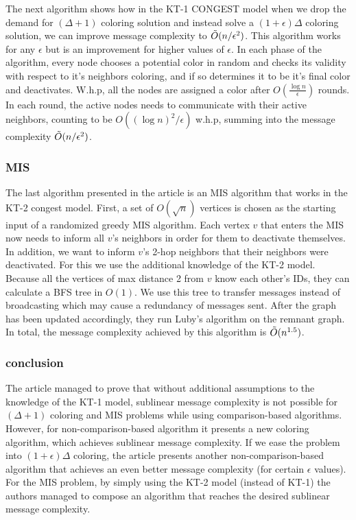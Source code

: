 \documentclass[11pt]{article}
\begin{document}
The next algorithm shows how in the KT-1 CONGEST model when we drop the demand for $(\Delta+1)$ coloring solution and instead solve a $(1+\epsilon)\Delta$ coloring solution, we can improve message complexity to $\Tilde{O}(n/\epsilon^2)$. This algorithm works for any $\epsilon$ but is an improvement for higher values of $\epsilon$.
In each phase of the algorithm, every node chooses a potential color in random and checks its validity with respect to it's neighbors coloring, and if so determines it to be it's final color and deactivates. W.h.p, all the nodes are assigned a color after $O(\frac{\log{n}}{\epsilon})$ rounds. In each round, the active nodes needs to communicate with their active neighbors, counting to be $O((\log{n})^{2}/ \epsilon)$ w.h.p, summing into the message complexity $\Tilde{O}(n/\epsilon^2)$.

\subsubsection*{MIS}

The last algorithm presented in the article is an MIS algorithm that works in the KT-2 congest model. First, a set of $O(\sqrt{n})$ vertices is chosen as the starting input of a randomized greedy MIS algorithm. Each vertex $v$ that enters the MIS now needs to inform all $v$'s neighbors in order for them to deactivate themselves. In addition, we want to inform $v$'s 2-hop neighbors that their neighbors were deactivated. For this we use the additional knowledge of the KT-2 model. Because all the vertices of max distance 2 from $v$ know each other's IDs, they can calculate a BFS tree in $O(1)$. We use this tree to transfer messages instead of broadcasting which may cause a redundancy of messages sent. After the graph has been updated accordingly, they run Luby's \cite{Luby} algorithm on the remnant graph. In total, the message complexity achieved by this algorithm is $\Tilde{O}(n^{1.5})$.

\subsubsection*{conclusion}
The article managed to prove that without additional assumptions to the knowledge of the KT-1 model, sublinear message complexity is not possible for $(\Delta + 1)$ coloring and MIS problems while using comparison-based algorithms. However, for non-comparison-based algorithm it presents a new coloring algorithm, which achieves sublinear message complexity. If we ease the problem into $(1+\epsilon)\Delta$ coloring, the article presents another non-comparison-based algorithm that achieves an even better message complexity (for certain $\epsilon$ values). For the MIS problem, by simply using the KT-2 model (instead of KT-1) the authors managed to compose an algorithm that reaches the desired sublinear message complexity.
\newline
\end{document}
